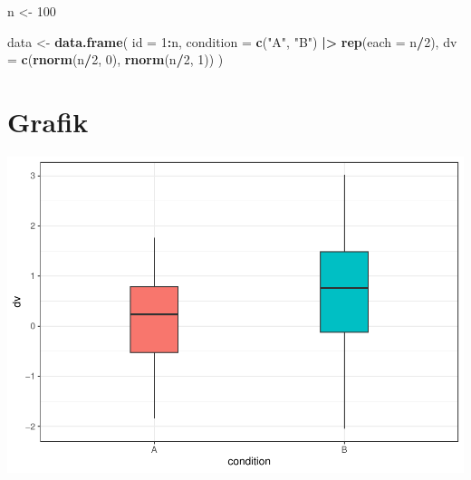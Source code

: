 \documentclass[
  oneside]{book}
\newenvironment{Shaded}{\begin{snugshade}}{\end{snugshade}}
\newcommand{\AttributeTok}[1]{\textcolor[rgb]{0.13,0.29,0.53}{#1}}
\newcommand{\DecValTok}[1]{\textcolor[rgb]{0.00,0.00,0.81}{#1}}
\newcommand{\FunctionTok}[1]{\textcolor[rgb]{0.13,0.29,0.53}{\textbf{#1}}}
\newcommand{\NormalTok}[1]{#1}
\newcommand{\OtherTok}[1]{\textcolor[rgb]{0.56,0.35,0.01}{#1}}
\newcommand{\SpecialCharTok}[1]{\textcolor[rgb]{0.81,0.36,0.00}{\textbf{#1}}}
\newcommand{\StringTok}[1]{\textcolor[rgb]{0.31,0.60,0.02}{#1}}
\begin{document}
\begin{Shaded}
\begin{Highlighting}[]
\NormalTok{n }\OtherTok{\textless{}{-}} \DecValTok{100}

\NormalTok{data }\OtherTok{\textless{}{-}} \FunctionTok{data.frame}\NormalTok{(}
  \AttributeTok{id =} \DecValTok{1}\SpecialCharTok{:}\NormalTok{n,}
  \AttributeTok{condition =} \FunctionTok{c}\NormalTok{(}\StringTok{"A"}\NormalTok{, }\StringTok{"B"}\NormalTok{) }\SpecialCharTok{|\textgreater{}} \FunctionTok{rep}\NormalTok{(}\AttributeTok{each =}\NormalTok{ n}\SpecialCharTok{/}\DecValTok{2}\NormalTok{),}
  \AttributeTok{dv =} \FunctionTok{c}\NormalTok{(}\FunctionTok{rnorm}\NormalTok{(n}\SpecialCharTok{/}\DecValTok{2}\NormalTok{, }\DecValTok{0}\NormalTok{), }\FunctionTok{rnorm}\NormalTok{(n}\SpecialCharTok{/}\DecValTok{2}\NormalTok{, }\DecValTok{1}\NormalTok{))}
\NormalTok{)}
\end{Highlighting}
\end{Shaded}

\hypertarget{grafik}{%
\section{Grafik}\label{grafik}}

\begin{center}\includegraphics[width=1\linewidth]{repro_files/figure-latex/condition-plot-1} \end{center}

  
\end{document}
